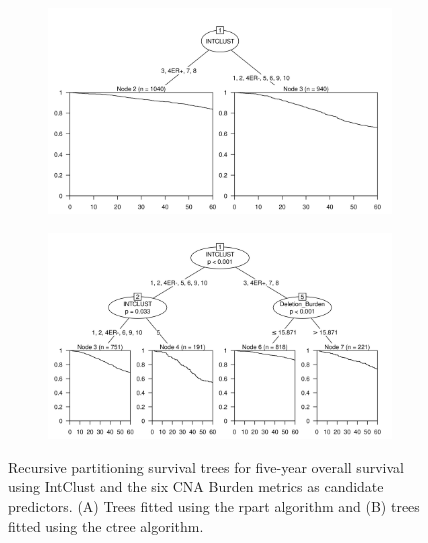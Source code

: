 \begin{figure}[!htb]
\centering

\vspace{0.5cm}

\begin{subfigure}{\textwidth}
\subcaption{}
\includegraphics[width=1\textwidth]{../figures/Appendices/Appendix_B/PartyKit_Survival_Burden_FiveYearOS_INTCLUST.png}
\end{subfigure}

\vspace{2cm}

\begin{subfigure}{\textwidth}
\subcaption{}
\includegraphics[width=1\textwidth]{../figures/Appendices/Appendix_B/Ctree_Survival_Burden_FiveYearOS_INTCLUST.png}
\end{subfigure}

\vspace{0.5cm}

\caption[Recursive partitioning survival trees for five-year overall survival using IntClust and the six CNA Burden metrics as candidate predictors.]{Recursive partitioning survival trees for five-year overall survival using IntClust and the six CNA Burden metrics as candidate predictors. (A) Trees fitted using the rpart algorithm and (B) trees fitted using the ctree algorithm.}
\end{figure}

